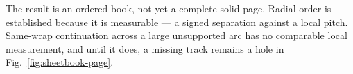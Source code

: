 The result is an ordered book, not yet a complete solid page. Radial order is established because it is measurable --- a signed separation against a local pitch. Same-wrap continuation across a large unsupported arc has no comparable local measurement, and until it does, a missing track remains a hole in Fig.~\ref{fig:sheetbook-page}.
